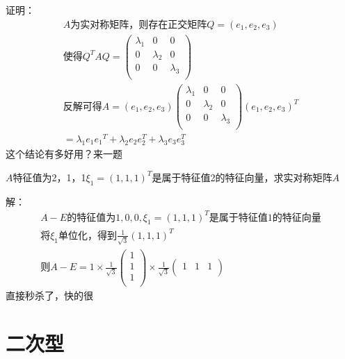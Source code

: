 \documentclass[lang=cn,10pt]{elegantbook}
\begin{document}
	证明：
	\begin{equation*}
		\begin{split}
			A\text{为实对称矩阵，则存在正交矩阵}Q=\left( e_1,e_2,e_3 \right) 
			\\
			\text{使得}Q^TAQ=\left( \begin{matrix}
				\lambda _1&		0&		0\\
				0&		\lambda _2&		0\\
				0&		0&		\lambda _3\\
			\end{matrix} \right) 
			\\
			\text{反解可得}A=\left( e_1,e_2,e_3 \right) \left( \begin{matrix}
				\lambda _1&		0&		0\\
				0&		\lambda _2&		0\\
				0&		0&		\lambda _3\\
			\end{matrix} \right) \left( e_1,e_2,e_3 \right) ^T
			\\
			=\lambda _1e_1{e_1}^T+\lambda _2e_2e_{2}^{T}+\lambda _3e_3e_{3}^{T}
		\end{split}
	\end{equation*}
	这个结论有多好用？来一题
	
	$A$特征值为2，1，1$\xi_{1}=(1,1,1)^{T}$是属于特征值2的特征向量，求实对称矩阵$A$
	
	解：
	\begin{equation*}
		\begin{split}
			A-E\text{的特征值为}1,0,0,\xi _1=(1,1,1)^T\text{是属于特征值}1\text{的特征向量}
			\\
			\text{将}\xi _1\text{单位化，得到}\frac{1}{\sqrt{3}}(1,1,1)^T
			\\
			\text{则}A-E=1\times \frac{1}{\sqrt{3}}\left( \begin{array}{c}
				1\\
				1\\
				1\\
			\end{array} \right) \times \frac{1}{\sqrt{3}}\left( \begin{matrix}
				1&		1&		1\\
			\end{matrix} \right) 
		\end{split}
	\end{equation*}
	直接秒杀了，快的很
\chapter{二次型}
\end{document}
